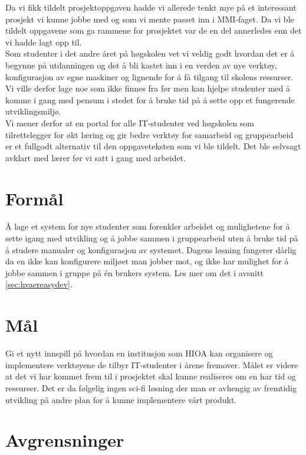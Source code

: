 Da vi fikk tildelt prosjektoppgaven hadde vi allerede tenkt mye på et interessant prosjekt vi kunne jobbe med og som vi mente passet inn i MMI-faget. Da vi ble tildelt oppgavene som ga rammene for prosjektet var de en del annerledes enn det vi hadde lagt opp til.\\

Som studenter i det andre året på høgskolen vet vi veldig godt hvordan det er å begynne på utdanningen og det å bli kastet inn i en verden av nye verktøy, konfigurasjon av egne maskiner og lignende for å få tilgang til skolens ressurser. Vi ville derfor lage noe som ikke finnes fra før men kan hjelpe studenter med å komme i gang med pensum i stedet for å bruke tid på å sette opp et fungerende utviklingsmiljø. \\
Vi mener derfor at en portal for alle IT-studenter ved høgskolen som tilrettelegger for økt læring og gir bedre verktøy for samarbeid og gruppearbeid er et fullgodt alternativ til den oppgaveteksten som vi ble tildelt. Det ble selvsagt avklart med lærer før vi satt i gang med arbeidet. 

\section{Formål}
Å lage et system for nye studenter som forenkler arbeidet og mulighetene for å sette igang med utvikling og å jobbe sammen i gruppearbeid uten å bruke tid på å studere manualer og konfigurasjon av systemet. Dagens løsning fungerer dårlig da en ikke kan konfigurere miljøet man jobber mot, og ikke har mulighet for å jobbe sammen i gruppe på én brukers system. Les mer om det i avsnitt \ref{sec:hvaereasydev}.

\section{Mål}
Gi et nytt innspill på hvordan en institusjon som HIOA kan organisere og implementere verktøyene de tilbyr IT-studenter i årene fremover. 
Målet er videre at det vi har kommet frem til i prosjektet skal kunne realiseres om en har tid og ressurser. Det er da følgelig ingen sci-fi løsning der man er avhengig av fremtidig utvikling på andre plan for å kunne implementere vårt produkt.

\section{Avgrensninger} \label{sec:avgrensninger}

